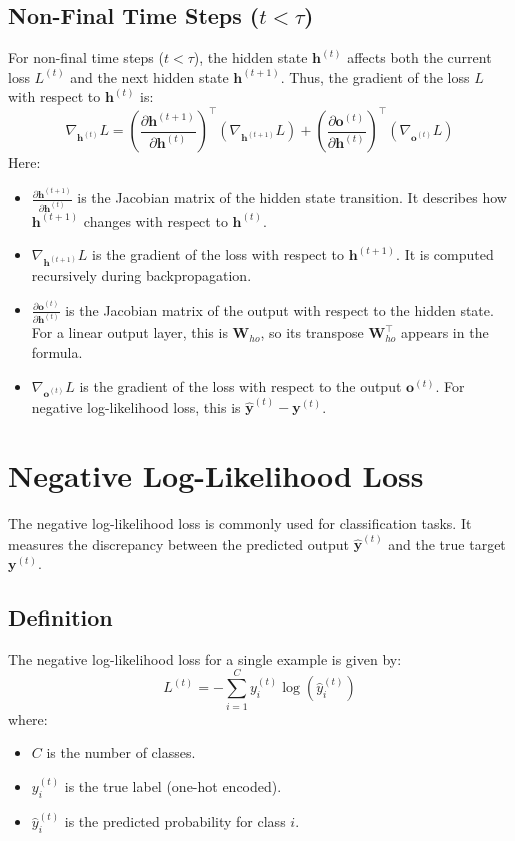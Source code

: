 \begin{notechapter}
\subsection{Non-Final Time Steps (\(t < \tau\))}
For non-final time steps (\(t < \tau\)), the hidden state \(\mathbf{h}^{(t)}\) 
affects both the current loss \(L^{(t)}\) and the next hidden state 
\(\mathbf{h}^{(t+1)}\). Thus, the gradient of the loss \(L\) with respect to 
\(\mathbf{h}^{(t)}\) is:
\[
\nabla_{\mathbf{h}^{(t)}} L = 
\left( \frac{\partial \mathbf{h}^{(t+1)}}{\partial \mathbf{h}^{(t)}} \right)^\top 
\left( \nabla_{\mathbf{h}^{(t+1)}} L \right) + 
\left( \frac{\partial \mathbf{o}^{(t)}}{\partial \mathbf{h}^{(t)}} \right)^\top 
\left( \nabla_{\mathbf{o}^{(t)}} L \right)
\]
Here:
\begin{itemize}
    \item \(\frac{\partial \mathbf{h}^{(t+1)}}{\partial \mathbf{h}^{(t)}}\) 
          is the Jacobian matrix of the hidden state transition. It describes 
          how \(\mathbf{h}^{(t+1)}\) changes with respect to \(\mathbf{h}^{(t)}\).
    \item \(\nabla_{\mathbf{h}^{(t+1)}} L\) is the gradient of the loss 
          with respect to \(\mathbf{h}^{(t+1)}\). It is computed recursively 
          during backpropagation.
    \item \(\frac{\partial \mathbf{o}^{(t)}}{\partial \mathbf{h}^{(t)}}\) 
          is the Jacobian matrix of the output with respect to the hidden 
          state. For a linear output layer, this is \(\mathbf{W}_{ho}\), so its transpose \(\mathbf{W}_{ho}^\top\) appears in the formula.
    \item \(\nabla_{\mathbf{o}^{(t)}} L\) is the gradient of the loss 
          with respect to the output \(\mathbf{o}^{(t)}\). For negative 
          log-likelihood loss, this is \(\hat{\mathbf{y}}^{(t)} - \mathbf{y}^{(t)}\).
\end{itemize}

\section{Negative Log-Likelihood Loss}
The negative log-likelihood loss is commonly used for classification tasks. 
It measures the discrepancy between the predicted output \(\hat{\mathbf{y}}^{(t)}\) 
and the true target \(\mathbf{y}^{(t)}\).

\subsection{Definition}
The negative log-likelihood loss for a single example is given by:
\[
L^{(t)} = -\sum_{i=1}^C y_i^{(t)} \log(\hat{y}_i^{(t)})
\]
where:
\begin{itemize}
    \item \( C \) is the number of classes.
    \item \( y_i^{(t)} \) is the true label (one-hot encoded).
    \item \( \hat{y}_i^{(t)} \) is the predicted probability for class \( i \).
\end{itemize}


\end{notechapter}
